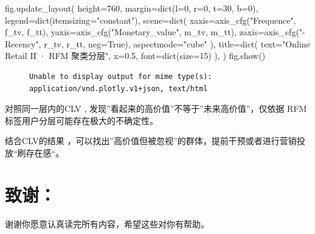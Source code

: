 \documentclass[
]{ctexart}
\newenvironment{Shaded}{\begin{snugshade}}{\end{snugshade}}
\newcommand{\BuiltInTok}[1]{\textcolor[rgb]{0.00,0.23,0.31}{#1}}
\newcommand{\DecValTok}[1]{\textcolor[rgb]{0.68,0.00,0.00}{#1}}
\newcommand{\FloatTok}[1]{\textcolor[rgb]{0.68,0.00,0.00}{#1}}
\newcommand{\NormalTok}[1]{\textcolor[rgb]{0.00,0.23,0.31}{#1}}
\newcommand{\OperatorTok}[1]{\textcolor[rgb]{0.37,0.37,0.37}{#1}}
\newcommand{\StringTok}[1]{\textcolor[rgb]{0.13,0.47,0.30}{#1}}
\newcommand{\VariableTok}[1]{\textcolor[rgb]{0.07,0.07,0.07}{#1}}
\begin{document}
\begin{Shaded}
\begin{Highlighting}[]
\NormalTok{fig.update\_layout(}
\NormalTok{    height}\OperatorTok{=}\DecValTok{760}\NormalTok{, margin}\OperatorTok{=}\BuiltInTok{dict}\NormalTok{(l}\OperatorTok{=}\DecValTok{0}\NormalTok{, r}\OperatorTok{=}\DecValTok{0}\NormalTok{, t}\OperatorTok{=}\DecValTok{30}\NormalTok{, b}\OperatorTok{=}\DecValTok{0}\NormalTok{),}
\NormalTok{    legend}\OperatorTok{=}\BuiltInTok{dict}\NormalTok{(itemsizing}\OperatorTok{=}\StringTok{"constant"}\NormalTok{),}
\NormalTok{    scene}\OperatorTok{=}\BuiltInTok{dict}\NormalTok{(}
\NormalTok{            xaxis}\OperatorTok{=}\NormalTok{axis\_cfg(}\StringTok{"Frequence"}\NormalTok{, f\_tv, f\_tt), }
\NormalTok{            yaxis}\OperatorTok{=}\NormalTok{axis\_cfg(}\StringTok{"Monetary\_value"}\NormalTok{, m\_tv, m\_tt), }
\NormalTok{            zaxis}\OperatorTok{=}\NormalTok{axis\_cfg(}\StringTok{"{-}Recency"}\NormalTok{, r\_tv, r\_tt, neg}\OperatorTok{=}\VariableTok{True}\NormalTok{), }
\NormalTok{            aspectmode}\OperatorTok{=}\StringTok{"cube"}
\NormalTok{        ),}
\NormalTok{    title}\OperatorTok{=}\BuiltInTok{dict}\NormalTok{(}
\NormalTok{            text}\OperatorTok{=}\StringTok{"Online Retail II · RFM 聚类分层"}\NormalTok{, }
\NormalTok{            x}\OperatorTok{=}\FloatTok{0.5}\NormalTok{, font}\OperatorTok{=}\BuiltInTok{dict}\NormalTok{(size}\OperatorTok{=}\DecValTok{15}\NormalTok{)}
\NormalTok{        ),}
\NormalTok{)}
\NormalTok{fig.show()}
\end{Highlighting}
\end{Shaded}

\begin{figure}[H]

\begin{verbatim}
Unable to display output for mime type(s): application/vnd.plotly.v1+json, text/html
\end{verbatim}

\end{figure}

对照同一层内的CLV , 发现''看起来的高价值''不等于''未来高价值''，仅依据
RFM 标签用户分层可能存在极大的不确定性。

结合CLV的结果
，可以找出''高价值但被忽视''的群体，提前干预或者进行营销投放``刷存在感``。

\section{致谢：}\label{ux81f4ux8c22}

谢谢你愿意认真读完所有内容，希望这些对你有帮助。
\end{document}
